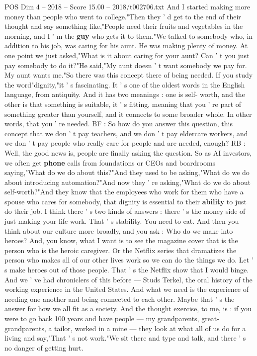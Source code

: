 \begin{textsample}{POS Dim 4 – 2018 – Score 15.00 – 2018/t002706.txt}
And I started making more money than people who went to college."Then they ' d get to the end of their thought and say something like,"People need their fruits and vegetables in the morning, and I ' m the \textbf{guy} who gets it to them."We talked to somebody who, in addition to his job, was caring for his aunt.
He was making plenty of money.
At one point we just asked,"What is it about caring for your aunt?
Can ' t you just pay somebody to do it?"He said,"My aunt doesn ' t want somebody we pay for.
My aunt wants me."So there was this concept there of being needed.
If you study the word"dignity,"it ' s fascinating.
It ' s one of the oldest words in the English language, from antiquity.
And it has two meanings : one is self- worth, and the other is that something is suitable, it ' s fitting, meaning that you ' re part of something greater than yourself, and it connects to some broader whole.
In other words, that you ' re needed.
BF : So how do you answer this question, this concept that we don ' t pay teachers, and we don ' t pay eldercare workers, and we don ' t pay people who really care for people and are needed, enough?
RB : Well, the good news is, people are finally asking the question.
So as AI investors, we often get \textbf{phone} calls from foundations or CEOs and boardrooms saying,"What do we do about this?"And they used to be asking,"What do we do about introducing automation?"And now they ' re asking,"What do we do about self-worth?"And they know that the employees who work for them who have a spouse who cares for somebody, that dignity is essential to their \textbf{ability} to just do their job.
I think there ' s two kinds of answers : there ' s the money side of just making your life work.
That ' s stability.
You need to eat.
And then you think about our culture more broadly, and you ask : Who do we make into heroes?
And, you know, what I want is to see the magazine cover that is the person who is the heroic caregiver.
Or the Netflix series that dramatizes the person who makes all of our other lives work so we can do the things we do.
Let ' s make heroes out of those people.
That ' s the Netflix show that I would binge.
And we ' ve had chroniclers of this before — Studs Terkel, the oral history of the working experience in the United States.
And what we need is the experience of needing one another and being connected to each other.
Maybe that ' s the answer for how we all fit as a society.
And the thought exercise, to me, is : if you were to go back 100 years and have people — my grandparents, great- grandparents, a tailor, worked in a mine — they look at what all of us do for a living and say,"That ' s not work."We sit there and type and talk, and there ' s no danger of getting hurt.

\end{textsample}
